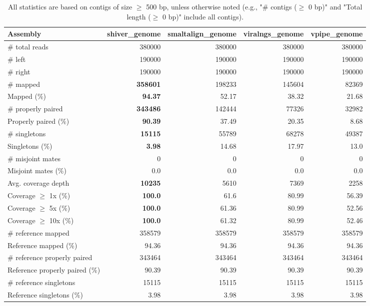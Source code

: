 \documentclass[12pt,a4paper]{article}
\begin{document}
\begin{table}[ht]
\begin{center}
\caption{All statistics are based on contigs of size $\geq$ 500 bp, unless otherwise noted (e.g., "\# contigs ($\geq$ 0 bp)" and "Total length ($\geq$ 0 bp)" include all contigs).}
\begin{tabular}{|l*{4}{|r}|}
\hline
Assembly & shiver\_genome & smaltalign\_genome & viralngs\_genome & vpipe\_genome \\ \hline
\# total reads & 380000 & 380000 & 380000 & 380000 \\ \hline
\# left & 190000 & 190000 & 190000 & 190000 \\ \hline
\# right & 190000 & 190000 & 190000 & 190000 \\ \hline
\# mapped & {\bf 358601} & 198233 & 145604 & 82369 \\ \hline
Mapped (\%) & {\bf 94.37} & 52.17 & 38.32 & 21.68 \\ \hline
\# properly paired & {\bf 343486} & 142444 & 77326 & 32982 \\ \hline
Properly paired (\%) & {\bf 90.39} & 37.49 & 20.35 & 8.68 \\ \hline
\# singletons & {\bf 15115} & 55789 & 68278 & 49387 \\ \hline
Singletons (\%) & {\bf 3.98} & 14.68 & 17.97 & 13.0 \\ \hline
\# misjoint mates & 0 & 0 & 0 & 0 \\ \hline
Misjoint mates (\%) & 0.0 & 0.0 & 0.0 & 0.0 \\ \hline
Avg. coverage depth & {\bf 10235} & 5610 & 7369 & 2258 \\ \hline
Coverage $\geq$ 1x (\%) & {\bf 100.0} & 61.6 & 80.99 & 56.39 \\ \hline
Coverage $\geq$ 5x (\%) & {\bf 100.0} & 61.36 & 80.99 & 52.56 \\ \hline
Coverage $\geq$ 10x (\%) & {\bf 100.0} & 61.32 & 80.99 & 52.46 \\ \hline
\# reference mapped & 358579 & 358579 & 358579 & 358579 \\ \hline
Reference mapped (\%) & 94.36 & 94.36 & 94.36 & 94.36 \\ \hline
\# reference properly paired & 343464 & 343464 & 343464 & 343464 \\ \hline
Reference properly paired (\%) & 90.39 & 90.39 & 90.39 & 90.39 \\ \hline
\# reference singletons & 15115 & 15115 & 15115 & 15115 \\ \hline
Reference singletons (\%) & 3.98 & 3.98 & 3.98 & 3.98 \\ \hline

\end{tabular}
\end{center}
\end{table}
\end{document}
